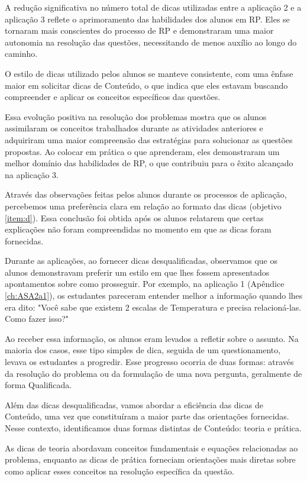 A redução significativa no número total de dicas utilizadas entre a aplicação 2 e a aplicação 3 reflete o aprimoramento das habilidades dos alunos em RP. Eles se tornaram mais conscientes do processo de RP e demonstraram uma maior autonomia na resolução das questões, necessitando de menos auxílio ao longo do caminho.

O estilo de dicas utilizado pelos alunos se manteve consistente, com uma ênfase maior em solicitar dicas de Conteúdo, o que indica que eles estavam buscando compreender e aplicar os conceitos específicos das questões.

Essa evolução positiva na resolução dos problemas mostra que os alunos assimilaram os conceitos trabalhados durante as atividades anteriores e adquiriram uma maior compreensão das estratégias para solucionar as questões propostas. Ao colocar em prática o que aprenderam, eles demonstraram um melhor domínio das habilidades de RP, o que contribuiu para o êxito alcançado na aplicação 3.

Através das observações feitas pelos alunos durante os processos de aplicação, percebemos uma preferência clara em relação ao formato das dicas (objetivo \ref{item:d}). Essa conclusão foi obtida após os alunos relatarem que certas explicações não foram compreendidas no momento em que as dicas foram fornecidas.

Durante as aplicações, ao fornecer dicas desqualificadas, observamos que os alunos demonstravam preferir um estilo em que lhes fossem apresentados apontamentos sobre como prosseguir. Por exemplo, na aplicação 1 (Apêndice \ref{ch:ASA2a1}), os estudantes pareceram entender melhor a informação quando lhes era dito: "Você sabe que existem 2 escalas de Temperatura e precisa relacioná-las. Como fazer isso?"

Ao receber essa informação, os alunos eram levados a refletir sobre o assunto. Na maioria dos casos, esse tipo simples de dica, seguida de um questionamento, levava os estudantes a progredir. Esse progresso ocorria de duas formas: através da resolução do problema ou da formulação de uma nova pergunta, geralmente de forma Qualificada.

Além das dicas desqualificadas, vamos abordar a eficiência das dicas de Conteúdo, uma vez que constituíram a maior parte das orientações fornecidas. Nesse contexto, identificamos duas formas distintas de Conteúdo: teoria e prática.

As dicas de teoria abordavam conceitos fundamentais e equações relacionadas ao problema, enquanto as dicas de prática forneciam orientações mais diretas sobre como aplicar esses conceitos na resolução específica da questão.

